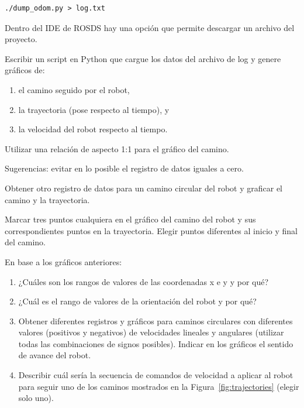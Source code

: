 \documentclass[tp]{lcc}
\begin{document}
\begin{lstlisting}[style=bash] 
./dump_odom.py > log.txt
\end{lstlisting}

Dentro del IDE de ROSDS hay una opción que permite descargar un archivo del proyecto.

\ejercicio Escribir un script en Python que cargue los datos del archivo de log y genere gráficos de:
\begin{enumerate}
	\item el camino seguido por el robot,
	\item la trayectoria (pose respecto al tiempo), y
	\item la velocidad del robot respecto al tiempo.
\end{enumerate} 

\nota Utilizar una relación de aspecto 1:1 para el gráfico del camino.

Sugerencias: evitar en lo posible el registro de datos iguales a cero.

\ejercicio Obtener otro registro de datos para un camino circular del robot y graficar el camino y la trayectoria.

\ejercicio Marcar tres puntos cualquiera en el gráfico del camino del robot y sus correspondientes puntos en la trayectoria. Elegir puntos diferentes al inicio y final del camino.


En base a los gráficos anteriores:

\begin{enumerate}

\item ¿Cuáles son los rangos de valores de las coordenadas x e y y por qué?

\item  ¿Cuál es el rango de valores de la orientación del robot y por qué?

\item Obtener diferentes registros y gráficos para caminos circulares con diferentes valores (positivos y negativos) de velocidades lineales y angulares (utilizar todas las combinaciones de signos posibles). Indicar en los gráficos el sentido de avance del robot.

\item Describir cuál sería la secuencia de comandos de velocidad a aplicar al robot para seguir uno de los caminos mostrados en la Figura~\ref{fig:trajectories} (elegir solo uno).

\end{enumerate}
\end{document}
